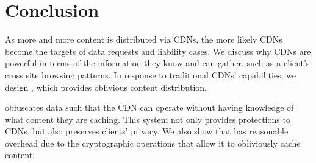 \section{Conclusion}
\label{sec:conclusion}

As more and more content is distributed via CDNs, the more likely CDNs become 
the targets of data requests and liability cases.  We discuss why CDNs are powerful in terms of the information they know 
and can gather, such as a client's cross site browsing patterns.  In response to 
traditional CDNs' capabilities, we design \system{}, which provides oblivious content 
distribution. 

\system{} obfuscates data such that the CDN can operate without having knowledge of 
what content they are caching.  This system not only provides protections to CDNs, but 
also preserves clients' privacy.  We also show that \system{} has reasonable overhead due to the cryptographic operations 
that allow it to obliviously cache content. 
